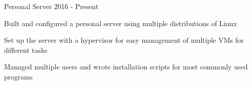 \begin{cventries}
	\cvproject
		{Personal Server}
		{2016 - Present}
		{
			\begin{cvitems}
			\item {Built and configured a personal server using multiple distributions of Linux}
			\item {Set up the server with a hypervisor for easy management of multiple VMs for different tasks}
			\item {Managed multiple users and wrote installation scripts for most commonly used programs}
			\end{cvitems}
		}

\end{cventries}
